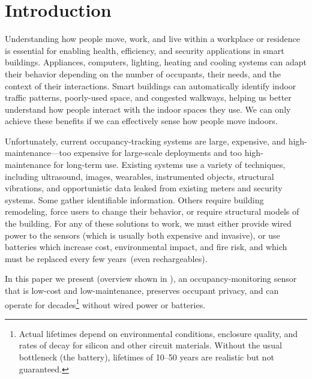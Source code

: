 

\section{Introduction}
\label{sec:intro}

Understanding how people move, work, and live within a workplace or residence is essential for enabling health, efficiency, and security applications in smart buildings.
Appliances, computers, lighting, heating and cooling systems can adapt their behavior depending on the number of occupants, their needs, and the context of their interactions.
Smart buildings can automatically identify indoor traffic patterns, poorly-used space, and congested walkways, helping us better understand how people interact with the indoor spaces they use.
We can only achieve these benefits if we can effectively sense how people move indoors.


Unfortunately, current occupancy-tracking systems are large, expensive, and high-maintenance---too expensive for large-scale deployments and too high-maintenance for long-term use.
%
Existing systems use a variety of techniques, including ultrasound\cite{hnat2012doorjamb}, images\cite{tyndall2016occupancy, teixeira2007lightweight}, wearables\cite{fishkin2005hands}, instrumented objects\cite{buettner2009activity}, structural vibrations\cite{pan2016occupant}, and opportunistic data leaked from existing meters and security systems\cite{yangoccupancy2014}.
Some gather identifiable information.  %
Others require building remodeling, force users to change their behavior, or require structural models of the building.
For any of these solutions to work, we must either provide wired power to the sensors (which is usually both expensive and invasive), or use batteries which increase cost, environmental impact, and fire risk, and which must be replaced every few years~(even rechargeables).

In this paper we present \sysname (overview shown in ), an occupancy-monitoring sensor that is low-cost and low-maintenance, preserves occupant privacy, and can operate for decades\footnote{Actual lifetimes depend on environmental conditions, enclosure quality, and rates of decay for silicon and other circuit materials. Without the usual bottleneck (the battery), lifetimes of 10--50 years are realistic but not guaranteed.} without wired power or batteries.
%


